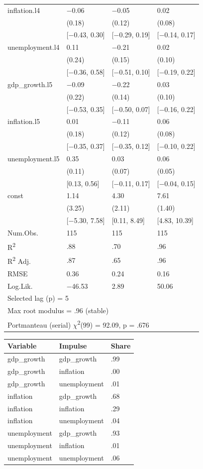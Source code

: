 \documentclass{article}
\begin{document}
\begin{tabular}{llll}
inflation.l4 & $-$0.06 & $-$0.05 & 0.02 \\
 & (0.18) & (0.12) & (0.08) \\
 & [$-$0.43, 0.30] & [$-$0.29, 0.19] & [$-$0.14, 0.17] \\
unemployment.l4 & 0.11 & $-$0.21 & 0.02 \\
 & (0.24) & (0.15) & (0.10) \\
 & [$-$0.36, 0.58] & [$-$0.51, 0.10] & [$-$0.19, 0.22] \\
gdp\_growth.l5 & $-$0.09 & $-$0.22 & 0.03 \\
 & (0.22) & (0.14) & (0.10) \\
 & [$-$0.53, 0.35] & [$-$0.50, 0.07] & [$-$0.16, 0.22] \\
inflation.l5 & 0.01 & $-$0.11 & 0.06 \\
 & (0.18) & (0.12) & (0.08) \\
 & [$-$0.35, 0.37] & [$-$0.35, 0.12] & [$-$0.10, 0.22] \\
unemployment.l5 & 0.35 & 0.03 & 0.06 \\
 & (0.11) & (0.07) & (0.05) \\
 & [0.13, 0.56] & [$-$0.11, 0.17] & [$-$0.04, 0.15] \\
const & 1.14 & 4.30 & 7.61 \\
 & (3.25) & (2.11) & (1.40) \\
 & [$-$5.30, 7.58] & [0.11, 8.49] & [4.83, 10.39] \\
\midrule
Num.Obs. & 115 & 115 & 115 \\
R\textsuperscript{2} & .88 & .70 & .96 \\
R\textsuperscript{2} Adj. & .87 & .65 & .96 \\
RMSE & 0.36 & 0.24 & 0.16 \\
Log.Lik. & $-$46.53 & 2.89 & 50.06 \\
\multicolumn{4}{l}{Selected lag (p) = 5} \\
\multicolumn{4}{l}{Max root modulus = .96 (stable)} \\
\multicolumn{4}{l}{Portmanteau (serial) $\chi$\textsuperscript{2}(99) = 92.09, p = .676} \\
\bottomrule
\end{tabular}

\begin{tabular}{lll}
\toprule
Variable & Impulse & Share \\
\midrule
gdp\_growth & gdp\_growth & .99 \\
gdp\_growth & inflation & .00 \\
gdp\_growth & unemployment & .01 \\
inflation & gdp\_growth & .68 \\
inflation & inflation & .29 \\
inflation & unemployment & .04 \\
unemployment & gdp\_growth & .93 \\
unemployment & inflation & .01 \\
unemployment & unemployment & .06 \\
\bottomrule
\end{tabular}
\end{document}
